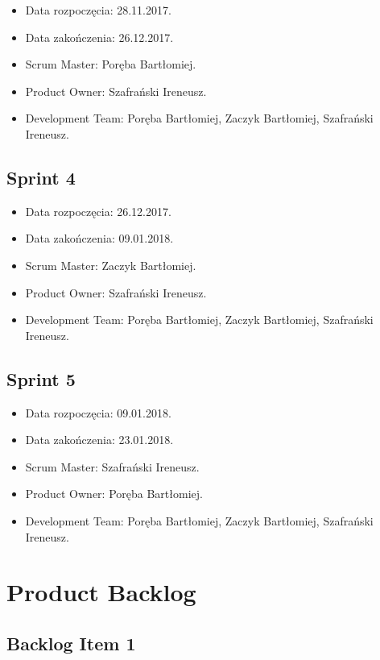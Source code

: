 \documentclass[a4paper]{article}
\begin{document}
\begin{itemize}
	\item Data rozpoczęcia: 28.11.2017.
	\item  Data zakończenia: 26.12.2017.
	\item Scrum Master: Poręba Bartłomiej.
	\item Product Owner: Szafrański Ireneusz.
	\item Development Team: Poręba Bartłomiej, Zaczyk Bartłomiej, Szafrański Ireneusz.
\end{itemize}

\subsection{Sprint 4}

\begin{itemize}
	\item Data rozpoczęcia: 26.12.2017.
	\item  Data zakończenia: 09.01.2018.
	\item Scrum Master: Zaczyk Bartłomiej.
	\item Product Owner: Szafrański Ireneusz.
	\item Development Team: Poręba Bartłomiej, Zaczyk Bartłomiej, Szafrański Ireneusz.
\end{itemize}

\subsection{Sprint 5}

\begin{itemize}
	\item Data rozpoczęcia: 09.01.2018.
	\item  Data zakończenia: 23.01.2018.
	\item Scrum Master: Szafrański Ireneusz.
	\item Product Owner: Poręba Bartłomiej.
	\item Development Team: Poręba Bartłomiej, Zaczyk Bartłomiej, Szafrański Ireneusz.
\end{itemize}


\section{Product Backlog}

\subsection{Backlog Item 1}
\end{document}
